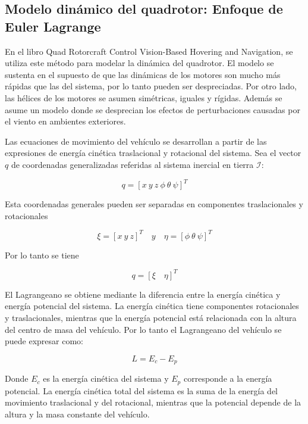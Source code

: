 \documentclass[\main/main.tex]{subfiles}
\begin{document}
\textcompwordmark{}

\subsection{Modelo dinámico del quadrotor: Enfoque de Euler Lagrange}

En el libro Quad Rotorcraft Control Vision-Based Hovering and Navigation,
se utiliza este método para modelar la dinámica del quadrotor. El
modelo se sustenta en el supuesto de que las dinámicas de los motores
son mucho más rápidas que las del sistema, por lo tanto pueden ser
despreciadas. Por otro lado, las hélices de los motores se asumen
simétricas, iguales y rígidas. Además se asume un modelo donde se
desprecian los efectos de perturbaciones causadas por el viento en
ambientes exteriores.

Las ecuaciones de movimiento del vehículo se desarrollan a partir
de las expresiones de energía cinética traslacional y rotacional del
sistema. Sea el vector $q$ de coordenadas
generalizadas referidas al sistema inercial en tierra $\mathcal{I}$:

\begin{equation}
q=[x\ y\ z\ \phi\ \theta\ \psi]^{T}
\end{equation}
 
Esta coordenadas generales pueden ser separadas en componentes traslacionales
y rotacionales

\begin{equation}
\xi=[x\ y\ z]^{T}\quad y\quad\eta=[\phi\ \theta\ \psi]^{T}
\end{equation}

Por lo tanto se tiene 

\begin{equation}
q=[\xi\quad\eta]^{T}
\end{equation}

El Lagrangeano se obtiene mediante la diferencia entre la energía
cinética y energía potencial del sistema. La energía cinética tiene
componentes rotacionales y traslacionales, mientras que la energía
potencial está relacionada con la altura del centro de masa del vehículo.
Por lo tanto el Lagrangeano del vehículo se puede expresar como:

\begin{equation}
L=E_{c}-E_{p}
\end{equation}

Donde $E_{c}$ es la energía cinética del sistema y $E_{p}$ corresponde
a la energía potencial. La energía cinética total del sistema es la
suma de la energía del movimiento traslacional y del rotacional, mientras
que la potencial depende de la altura y la masa constante del vehículo. 
\end{document}
